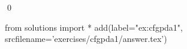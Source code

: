 
\begin{ex} 
  \label{ex:cfgpda1}
  
  \qed
\end{ex} 
\begin{python0}
from solutions import *
add(label="ex:cfgpda1",
    srcfilename='exercises/cfgpda1/answer.tex') 
\end{python0}
